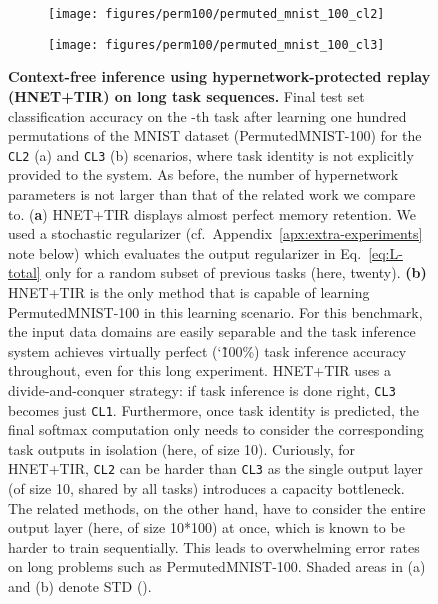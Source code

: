 \documentclass{article}
\begin{document}
\begin{figure}
    \centering
    \begin{subfigure}{0.49\linewidth}
    \caption{}
    \texttt{[image: figures/perm100/permuted\_mnist\_100\_cl2]}
    \end{subfigure}
    \begin{subfigure}{0.49\linewidth}
    \caption{}
    \texttt{[image: figures/perm100/permuted\_mnist\_100\_cl3]}
    \end{subfigure}
    \caption{\textbf{Context-free inference using hypernetwork-protected replay (HNET+TIR) on long task sequences.}
    Final test set classification accuracy on the -th task after learning one hundred permutations of the MNIST dataset (PermutedMNIST-100) for the \texttt{CL2} (a) and \texttt{CL3} (b) scenarios, where task identity is not explicitly provided to the system. As before, the number of hypernetwork parameters is not larger than that of the related work we compare to. (\textbf{a}) HNET+TIR displays almost perfect memory retention. We used a stochastic regularizer (cf.~Appendix~\ref{apx:extra-experiments} note below) which evaluates the output regularizer in Eq.~\ref{eq:L-total} only for a random subset of previous tasks (here, twenty). \textbf{(b)} 
    HNET+TIR is the only method that is capable of learning PermutedMNIST-100 in this learning scenario. For this benchmark, the input data domains are easily separable and the task inference system achieves virtually perfect (\char`\~ 100\%) task inference accuracy throughout, even for this long experiment. HNET+TIR uses a divide-and-conquer strategy: if task inference is done right, \texttt{CL3} becomes just \texttt{CL1}. Furthermore, once task identity is predicted, the final softmax computation only needs to consider the corresponding task outputs in isolation (here, of size 10). Curiously, for HNET+TIR, \texttt{CL2} can be harder than \texttt{CL3} as the single output layer (of size 10, shared by all tasks) introduces a capacity bottleneck. The related methods, on the other hand, have to consider the entire output layer (here, of size 10*100) at once, which is known to be harder to train sequentially. This leads to overwhelming error rates on long problems such as PermutedMNIST-100.
    Shaded areas in (a) and (b) denote STD ().\label{fig:sm:permutedMNIST100_CL23}}
\end{figure}

\clearpage
\newpage
\end{document}
